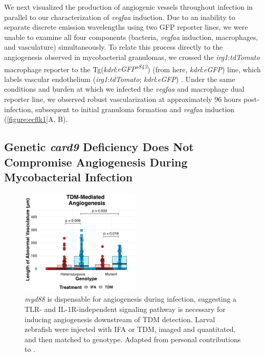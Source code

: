 We next visualized the production of angiogenic vessels throughout infection in parallel to our characterization of \textit{vegfaa} induction. Due to an inability to separate discrete emission wavelengths using two GFP reporter lines, we were unable to examine all four components (bacteria, \textit{vegfaa} induction, macrophages, and vasculature) simultaneously. To relate this process directly to the angiogenesis observed in mycobacterial granulomas, we crossed the \textit{irg1}:\textit{tdTomato} macrophage reporter to the Tg(\textit{kdrl}:\textit{eGFP\textsuperscript{s843}}) (from here, \textit{kdrl}:\textit{eGFP}) line, which labels vascular endothelium (\textit{irg1}:\textit{tdTomato}; \textit{kdrl}:\textit{eGFP}) \citep{Jin2005}. Under the same conditions and burden at which we infected the \textit{vegfaa} and macrophage dual reporter line, we observed robust vascularization at approximately 96 hours post-infection, subsequent to initial granuloma formation and \textit{vegfaa} induction (\autoref{figure:ecflk1}A, B). 

\subsection{Genetic \textit{card9} Deficiency Does Not Compromise Angiogenesis During Mycobacterial Infection}

\begin{figure}
\centering
\includegraphics[height=2in]{images/JB96_myd88_TDM_103022.png}
\caption{\textit{myd88} is dispensable for angiogenesis during infection, suggesting a TLR- and IL-1R-independent signaling pathway is necessary for inducing angiogenesis downstream of TDM detection. Larval zebrafish were injected with IFA or TDM, imaged and quantitated, and then matched to genotype. Adapted from personal contributions to \citet{Walton2018}.}
\label{figure:myd88}

\end{figure}

